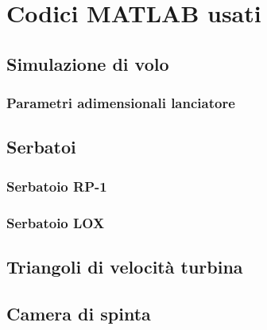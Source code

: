 \section{Codici MATLAB usati}
\label{appendix:codici}

\subsection{Simulazione di volo}



\subsubsection{Parametri adimensionali lanciatore}



\subsection{Serbatoi}

\subsubsection{Serbatoio RP-1}


\subsubsection{Serbatoio LOX}


\subsection{Triangoli di velocità turbina}


\subsection{Camera di spinta}

